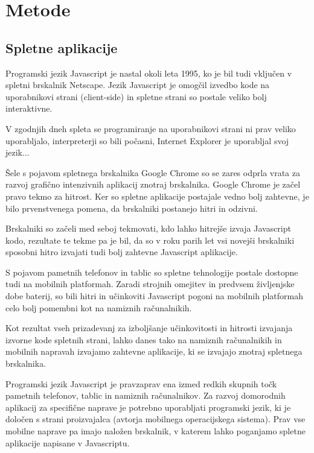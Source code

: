 \chapter{Metode}

\section{Spletne aplikacije}

Programski jezik Javascript je nastal okoli leta 1995, ko je bil tudi vključen v spletni brskalnik Netscape. Jezik Javascript je omogčil izvedbo kode na uporabnikovi strani (client-side) in spletne strani so postale veliko bolj interaktivne.

V zgodnjih dneh spleta se programiranje na uporabnikovi strani ni prav veliko uporabljalo, interpreterji so bili počasni, Internet Explorer je uporabljal svoj jezik...

Šele s pojavom spletnega brskalnika Google Chrome so se zares odprla vrata za razvoj grafično intenzivnih aplikacij znotraj brskalnika. Google Chrome je začel pravo tekmo za hitrost. Ker so spletne aplikacije postajale vedno bolj zahtevne, je bilo prvenstvenega pomena, da brskalniki postanejo hitri in odzivni.

Brskalniki so začeli med seboj tekmovati, kdo lahko hitrejše izvaja Javascript kodo, rezultate te tekme pa je bil, da so v roku parih let vsi novejši brskalniki sposobni hitro izvajati tudi bolj zahtevne Javascript aplikacije. 

S pojavom pametnih telefonov in tablic so spletne tehnologije postale dostopne tudi na mobilnih platformah. Zaradi strojnih omejitev in predvsem življenjske dobe baterij, so bili hitri in učinkoviti Javascript pogoni na mobilnih platformah celo bolj pomembni kot na namiznih računalnikih.

Kot rezultat vseh prizadevanj za izboljšanje učinkovitosti in hitrosti izvajanja izvorne kode spletnih strani, lahko danes tako na namiznih računalnikih in mobilnih napravah izvajamo zahtevne aplikacije, ki se izvajajo znotraj spletnega brskalnika.

Programski jezik Javascript je pravzaprav ena izmed redkih skupnih točk pametnih telefonov, tablic in namiznih računalnikov. Za razvoj domorodnih aplikacij za specifične naprave je potrebno uporabljati programski jezik, ki je določen s strani proizvajalca (avtorja mobilnega operacijskega sistema). Prav vse mobilne naprave pa imajo naložen brskalnik, v katerem lahko poganjamo spletne aplikacije napisane v Javascriptu.

